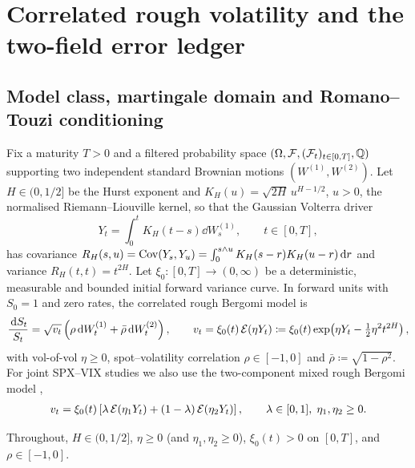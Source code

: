 \section{Correlated rough volatility and the two-field error ledger}
\label{sec:setting}

\subsection{Model class, martingale domain and Romano--Touzi conditioning}
\label{sec:model}

Fix a maturity $T>0$ and a filtered probability space $(\Omega,\mathcal{F},(\mathcal{F}_t)_{t\in[0,T]},\mathbb{Q})$ supporting two independent standard Brownian motions $(W^{(1)},W^{(2)})$. Let $H\in(0,1/2]$ be the Hurst exponent and $K_H(u)=\sqrt{2H}\,u^{H-1/2}$, $u>0$, the normalised Riemann--Liouville kernel, so that the Gaussian Volterra driver
\begin{equation}
  Y_t = \int_0^t K_H(t-s)\dd W_s^{(1)}, \qquad t\in[0,T],
  \label{eq:rl_driver}
\end{equation}
has covariance $R_H(s,u)=\operatorname{Cov}(Y_s,Y_u)=\int_0^{s\wedge u} K_H(s-r)K_H(u-r)\,\mathrm{d} r$ and variance $R_H(t,t)=t^{2H}$. Let $\xi_0:[0,T]\to(0,\infty)$ be a deterministic, measurable and bounded initial forward variance curve. In forward units with $S_0=1$ and zero rates, the correlated rough Bergomi model \citep{BayerFrizGatheral2016} is
\begin{equation}
  \begin{gathered}
  \frac{\,\mathrm{d} S_t}{S_t} = \sqrt{v_t}\left(\rho\,\mathrm{d} W_t^{(1)} + \bar{\rho}\,\mathrm{d} W_t^{(2)}\right),
  \qquad
  v_t = \xi_0(t)\,\mathcal{E}(\eta Y_t) \coloneqq \xi_0(t)\exp\!\left(\eta Y_t - \tfrac12\eta^2 t^{2H}\right),
  \end{gathered}
  \label{eq:rbergomi}
\end{equation}
with vol-of-vol $\eta\ge 0$, spot--volatility correlation $\rho\in[-1,0]$ and $\bar{\rho}\coloneqq\sqrt{1-\rho^2}$. For joint SPX--VIX studies we also use the two-component mixed rough Bergomi model \citep{Romer2022,BourgeyDeMarcoGobet2023},
\begin{equation}
  \begin{gathered}
  v_t = \xi_0(t)\left[\lambda\,\mathcal{E}(\eta_1 Y_t) + (1-\lambda)\,\mathcal{E}(\eta_2 Y_t)\right],
  \qquad \lambda\in[0,1],\; \eta_1,\eta_2\ge 0.
  \end{gathered}
  \label{eq:mixed_rbergomi}
\end{equation}

\begin{assumption}
\label{assump:domain}
Throughout, $H\in(0,1/2]$, $\eta\ge 0$ (and $\eta_1,\eta_2\ge 0$), $\xi_0(t)>0$ on $[0,T]$, and $\rho\in[-1,0]$.
\end{assumption}

